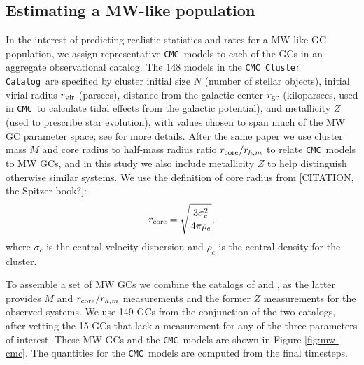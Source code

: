 \documentclass[twocolumn]{aastex631}
\newcommand{\CMC}{\texttt{CMC}}
\newcommand{\CMCcat}{\texttt{CMC Cluster Catalog}}
\begin{document}
\subsection{Estimating a MW-like population} \label{subsec:est_MW-like}


In the interest of predicting realistic statistics and rates for a MW-like GC population, we assign representative \CMC\ models to each of the GCs in an aggregate observational catalog.
The 148 models in the \CMCcat\ are specified by cluster initial size $N$ (number of stellar objects), initial virial radius $r_{\rm vir}$ (parsecs), distance from the galactic center $r_{\rm gc}$ (kiloparsecs, used in \CMC\ to calculate tidal effects from the galactic potential), and metallicity $Z$ (used to prescribe star evolution), with values chosen to span much of the MW GC parameter space; see \citet{2020IAUS..351..357K} for more details.
After the same paper we use cluster mass $M$ and core radius to half-mass radius ratio $r_{\rm core} / r_{h,m}$ to relate \CMC\ models to MW GCs, and in this study we also include metallicity $Z$ to help distinguish otherwise similar systems.
We use the definition of core radius from [CITATION, the Spitzer book?]:
\begin{equation}
    r_{\rm core} = \sqrt{\frac{3 \sigma_c^2}{4 \pi \rho_c}},
\end{equation}
where $\sigma_c$ is the central velocity dispersion and $\rho_c$ is the central density for the cluster.

To assemble a set of MW GCs we combine the catalogs of \citet{2010arXiv1012.3224H} and \citet{2018MNRAS.478.1520B}, as the latter provides $M$ and $r_{\rm core} / r_{h,m}$ measurements and the former $Z$ measurements for the observed systems.
We use 149 GCs from the conjunction of the two catalogs, after vetting the 15 GCs that lack a measurement for any of the three parameters of interest.
These MW GCs and the \CMC\ models are shown in Figure \ref{fig:mw-cmc}.
The quantities for the \CMC\ models are computed from the final timesteps.

\end{document}

